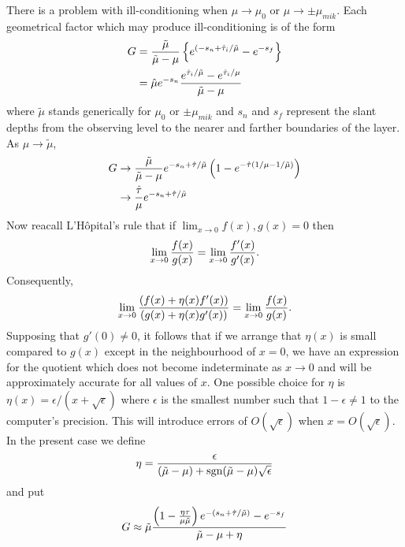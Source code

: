 There is a problem with ill-conditioning when $\mu\rightarrow\mu_0$ or
$\mu\rightarrow\pm\mu_{mik}$. Each geometrical factor which may produce
ill-conditioning is of the form
\begin{equation}
\begin{split}
G&={{\tilde\mu}\over{\tilde\mu-\mu}} \left \{ e^{(-s_n+\hat\tau_i/{\tilde\mu}}
-e^{-s_f} \right \} \\
&= \hat\mu e^{-s_n} { {e^{\hat\tau_i/{\tilde\mu}} -e^{\hat\tau_i/{\mu}}}
\over{\tilde\mu-\mu}}
\end{split}
\end{equation}
where $\tilde\mu$ stands generically for $\mu_0$ or $\pm\mu_{mik}$ and $s_n$ and
$s_f$ represent the slant depths from the observing level to the nearer and
farther boundaries of the layer. As $\mu\rightarrow\tilde\mu$,
\begin{equation}
\begin{split}
G&\rightarrow {{\tilde\mu}\over{\tilde\mu-\mu}} e^{-s_n+\hat\tau/{\tilde\mu}} 
\left ( 1 - e^{-\hat\tau(1/\mu-1/\tilde\mu)} \right ) \\
&\rightarrow {\hat\tau\over\mu} e^{-s_n+\hat\tau/{\tilde\mu}}
\end{split}
\end{equation}
Now reacall L'H\^opital's rule that if $\lim_{x\rightarrow 0} f(x), g(x)=0$
then 
\begin{equation}
\lim_{x\rightarrow 0} {{f(x)}\over{g(x)}}
=\lim_{x\rightarrow 0} {{f'(x)}\over{g'(x)}}.
\end{equation}
Consequently, 
\begin{equation}
\lim_{x\rightarrow 0} {{(f(x)+\eta(x)f'(x))}\over{(g(x)+\eta(x)g'(x))}}
=\lim_{x\rightarrow 0} {{f(x)}\over{g(x)}}. 
\end{equation}
Supposing that $g'(0)\ne 0$, it follows 
that if we arrange that $\eta(x)$ is small compared to $g(x)$ except in
the neighbourhood of $x=0$, we have an expression for the quotient which
does not become indeterminate as $x\rightarrow 0$ and will be approximately
accurate for
all values of $x$. One possible choice for $\eta$ is $\eta(x)=\epsilon/
(x+\sqrt\epsilon)$ where $\epsilon$ is the smallest number such that
$1-\epsilon\ne1$ to the computer's precision. This will introduce errors of
$O(\sqrt\epsilon)$ when $x=O(\sqrt\epsilon)$. In the present case we define
\begin{equation}
\eta={\epsilon\over{(\tilde\mu-\mu)+\mbox{sgn}(\tilde\mu-\mu)\sqrt\epsilon}}
\end{equation}
and put
\begin{equation}
G\approx \tilde\mu { { \left ( 1 - {{\eta\tau}\over{\mu\tilde\mu}} \right )
e^{-(s_n+\hat\tau/\tilde\mu)}-e^{-s_f} } \over {\tilde\mu-\mu+\eta} }
\end{equation}



